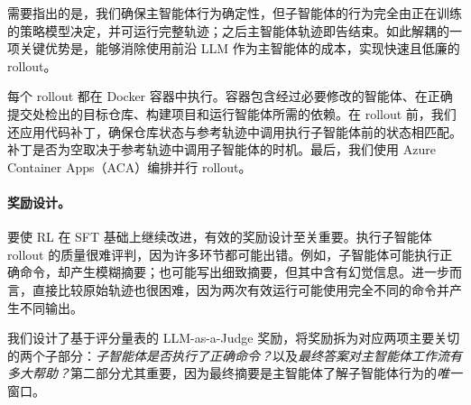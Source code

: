 \documentclass[sigconf,review]{acmart}
\begin{document}
需要指出的是，我们确保主智能体行为确定性，但子智能体的行为完全由正在训练的策略模型决定，并可运行完整轨迹；之后主智能体轨迹即告结束。如此解耦的一项关键优势是，能够消除使用前沿 LLM 作为主智能体的成本，实现快速且低廉的 rollout。

每个 rollout 都在 Docker 容器中执行。容器包含经过必要修改的智能体、在正确提交处检出的目标仓库、构建项目和运行智能体所需的依赖。在 rollout 前，我们还应用代码补丁，确保仓库状态与参考轨迹中调用执行子智能体前的状态相匹配。补丁是否为空取决于参考轨迹中调用子智能体的时机。最后，我们使用 Azure Container Apps（ACA）编排并行 rollout。

\paragraph{奖励设计。}
要使 RL 在 SFT 基础上继续改进，有效的奖励设计至关重要。执行子智能体 rollout 的质量很难评判，因为许多环节都可能出错。例如，子智能体可能执行正确命令，却产生模糊摘要；也可能写出细致摘要，但其中含有幻觉信息。进一步而言，直接比较原始轨迹也很困难，因为两次有效运行可能使用完全不同的命令并产生不同输出。

我们设计了基于评分量表的 LLM-as-a-Judge 奖励，将奖励拆为对应两项主要关切的两个子部分：\textit{子智能体是否执行了正确命令？}以及\textit{最终答案对主智能体工作流有多大帮助？}第二部分尤其重要，因为最终摘要是主智能体了解子智能体行为的\textit{唯一}窗口。
\end{document}
